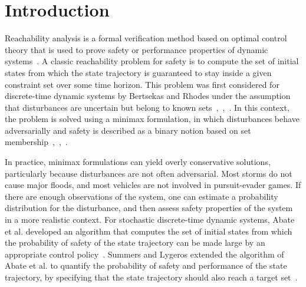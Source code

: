 \documentclass[letterpaper, 10 pt, conference]{ieeeconf}  %
\begin{document}
\section{Introduction}
Reachability analysis is a formal verification method based on optimal control theory that is used to prove 
safety or performance properties of dynamic systems~\cite{bansal2017hamilton}.
A classic reachability problem for safety is to compute the set of initial states from which 
the state trajectory is guaranteed to stay inside a given constraint set over some time horizon.
This problem was first considered for discrete-time dynamic systems by Bertsekas and Rhodes 
under the assumption that disturbances are uncertain but belong to known sets~\cite{bertsekas1971control},~\cite{bertsekas1971minimax},~\cite{bertsekas2005dynamic}.
In this context, the problem is solved using a minimax formulation,
in which disturbances behave adversarially and safety is described as a binary notion based on set membership~\cite{bertsekas1971control},~\cite{bertsekas1971minimax},~\cite{bertsekas2005dynamic}.\footnotemark 
{}

In practice, minimax formulations can yield overly conservative solutions, particularly because disturbances are not often adversarial.
Most storms do not cause major floods, and most vehicles are not involved in pursuit-evader games.
If there are enough observations of the system, one can estimate a probability distribution
for the disturbance, and then assess safety properties of the system in a more realistic context.\footnotemark
{} 
For stochastic discrete-time dynamic systems, %
Abate et al. developed an algorithm that computes the set of initial states
from which the probability of safety of the state trajectory can be made large by an appropriate control policy~\cite{abate2008probabilistic}.\footnotemark
{} 
Summers and Lygeros extended the algorithm of Abate et al. to quantify the probability of safety and performance
of the state trajectory, by specifying that the state trajectory should also reach a target set~\cite{summers2010verification}.   
\end{document}
